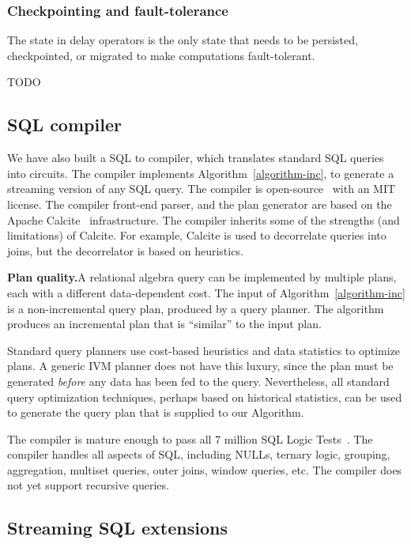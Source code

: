 \subsubsection{Checkpointing and fault-tolerance}

The state in delay operators is the only state that needs to be
persisted, checkpointed, or migrated to make \dbsp computations
fault-tolerant.

TODO

\subsection{SQL compiler}

We have also built a SQL to \dbsp compiler, which translates standard
SQL queries into \dbsp circuits.  The compiler implements
Algorithm~\ref{algorithm-inc}, to generate a streaming version of any
SQL query.  The compiler is open-source~\cite{sql-to-dbsp-compiler}
with an MIT license.  The compiler front-end parser, and the plan
generator are based on the Apache Calcite~\cite{begoli-icmd18}
infrastructure.  The compiler inherits some of the strengths (and
limitations) of Calcite.  For example, Calcite is used to decorrelate
queries into joins, but the decorrelator is based on heuristics.

\textbf{Plan quality.}A relational algebra query can be implemented
by multiple plans, each with a different data-dependent cost.  The
input of Algorithm~\ref{algorithm-inc} is a non-incremental query
plan, produced by a query planner.  The algorithm produces an
incremental plan that is ``similar'' to the input plan.

Standard query planners use cost-based heuristics and data statistics
to optimize plans.  A generic IVM planner does not have this luxury,
since the plan must be generated \emph{before} any data has been fed
to the query.  Nevertheless, all standard query optimization
techniques, perhaps based on historical statistics, can be used to
generate the query plan that is supplied to our Algorithm.

The compiler is mature enough to pass all 7 million SQL Logic
Tests~\cite{sqllogictest}.  The compiler handles all aspects of SQL,
including NULLs, ternary logic, grouping, aggregation, multiset
queries, outer joins, window queries, etc.  The compiler does not yet
support recursive queries.

\subsection{Streaming SQL extensions}

